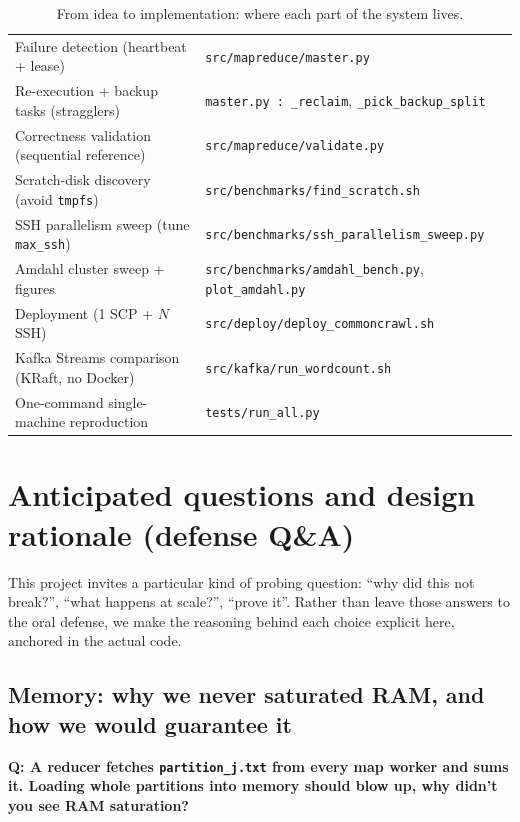 \documentclass[11pt,a4paper]{article}
\newcommand{\code}[1]{\texttt{\small #1}}
\begin{document}
\begin{table}[H]
\begin{tabularx}{\textwidth}{@{}X l@{}}
Failure detection (heartbeat + lease) & \code{src/mapreduce/master.py}\\
Re-execution + backup tasks (stragglers) & \code{master.py\,:\,\_reclaim}, \code{\_pick\_backup\_split}\\
Correctness validation (sequential reference) & \code{src/mapreduce/validate.py}\\
Scratch-disk discovery (avoid \code{tmpfs}) & \code{src/benchmarks/find\_scratch.sh}\\
SSH parallelism sweep (tune \code{max\_ssh}) & \code{src/benchmarks/ssh\_parallelism\_sweep.py}\\
Amdahl cluster sweep + figures & \code{src/benchmarks/amdahl\_bench.py}, \code{plot\_amdahl.py}\\
Deployment (1 SCP + $N$ SSH) & \code{src/deploy/deploy\_commoncrawl.sh}\\
Kafka Streams comparison (KRaft, no Docker) & \code{src/kafka/run\_wordcount.sh}\\
One-command single-machine reproduction & \code{tests/run\_all.py}\\
\bottomrule
\end{tabularx}
\caption{From idea to implementation: where each part of the system lives.}
\label{tab:implmap}
\end{table}

\section{Anticipated questions and design rationale (defense Q\&A)}\label{sec:qa}

This project invites a particular kind of probing question: ``why did
this not break?'', ``what happens at scale?'', ``prove it''. Rather than leave
those answers to the oral defense, we make the reasoning behind each choice
explicit here, anchored in the actual code.

\subsection{Memory: why we never saturated RAM, and how we would guarantee it}
\label{sec:qa-mem}

\textbf{Q: A reducer fetches \code{partition\_j.txt} from every map worker and
sums it. Loading whole partitions into memory should blow up, why didn't you
see RAM saturation?}
\end{document}
